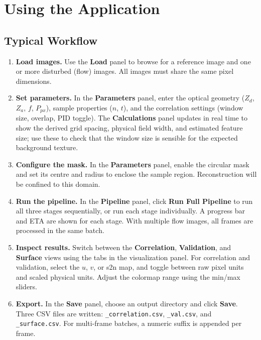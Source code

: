 \documentclass[11pt]{article}
\begin{document}
\section{Using the Application}
\label{sec:usage}

\subsection{Typical Workflow}

\begin{enumerate}
  \item \textbf{Load images.} Use the \textbf{Load} panel to browse for a
        reference image and one or more disturbed (flow) images.
        All images must share the same pixel dimensions.

  \item \textbf{Set parameters.} In the \textbf{Parameters} panel, enter
        the optical geometry ($Z_d$, $Z_a$, $f$, $P_{px}$), sample
        properties ($n$, $t$), and the correlation settings (window size,
        overlap, PID toggle). The \textbf{Calculations} panel updates in
        real time to show the derived grid spacing, physical field width,
        and estimated feature size; use these to check that the window
        size is sensible for the expected background texture.

  \item \textbf{Configure the mask.} In the \textbf{Parameters} panel,
        enable the circular mask and set its centre and radius to enclose
        the sample region. Reconstruction will be confined to this domain.

  \item \textbf{Run the pipeline.} In the \textbf{Pipeline} panel, click
        \textbf{Run Full Pipeline} to run all three stages sequentially, or run
        each stage individually. A progress bar and ETA are shown for
        each stage. With multiple flow images, all frames are processed
        in the same batch.

  \item \textbf{Inspect results.} Switch between the \textbf{Correlation},
        \textbf{Validation}, and \textbf{Surface} views using the tabs in
        the visualization panel. For correlation and validation, select
        the $u$, $v$, or s2n map, and toggle between raw pixel units and
        scaled physical units. Adjust the colormap range using the
        min/max sliders.

  \item \textbf{Export.} In the \textbf{Save} panel, choose an output
        directory and click \textbf{Save}. Three CSV files are written:
        \texttt{\_correlation.csv}, \texttt{\_val.csv}, and
        \texttt{\_surface.csv}. For multi-frame batches, a numeric suffix
        is appended per frame.
\end{enumerate}
\end{document}

